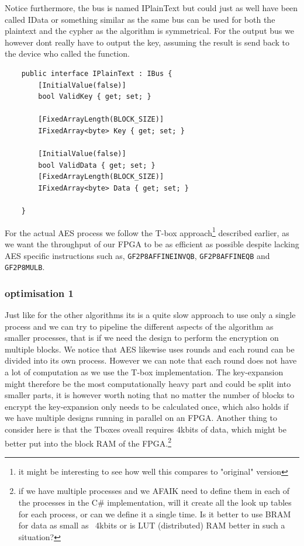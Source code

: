 \documentclass[a4paper]{article}
\begin{document}
Notice furthermore, the bus is named IPlainText but could just as well have been called IData or something similar as the same bus can be used for both the plaintext and the cypher as the algorithm is symmetrical. For the output bus we however dont really have to output the key, assuming the result is send back to the device who called the function.
\begin{verbatim}
    public interface IPlainText : IBus {
        [InitialValue(false)]
        bool ValidKey { get; set; }

        [FixedArrayLength(BLOCK_SIZE)]
        IFixedArray<byte> Key { get; set; }

        [InitialValue(false)]
        bool ValidData { get; set; }
        [FixedArrayLength(BLOCK_SIZE)]
        IFixedArray<byte> Data { get; set; }

    }
\end{verbatim}
For the actual AES process we follow the T-box approach\footnote{it might be interesting to see how well this compares to "original" version} described earlier, as we want the throughput of our FPGA to be as efficient as possible despite lacking AES specific instructions such as, \texttt{GF2P8AFFINEINVQB}, \texttt{GF2P8AFFINEQB} and \texttt{GF2P8MULB}.
\subsubsection{optimisation 1}
\label{AESopt}
Just like for the other algorithms its is a quite slow approach to use only a single process and we can try to pipeline the different aspects of the algorithm as smaller processes, that is if we need the design to perform the encryption on multiple blocks. We notice that AES likewise uses rounds and each round can be divided into its own process. However we can note that each round does not have a lot of computation as we use the T-box implementation. The key-expansion might therefore be the most computationally heavy part and could be split into smaller parts, it is however worth noting that no matter the number of blocks to encrypt the key-expansion only needs to be calculated once, which also holds if we have multiple designs running in parallel on an FPGA. Another thing to consider here is that the Tboxes oveall requires 4kbits of data, which might be better put into the block RAM of the FPGA.\footnote{if we have multiple processes and we AFAIK need to define them in each of the processes in the C# implementation, will it create all the look up tables for each process, or can we define it a single time. Is it better to use BRAM for data as small as ~4kbits or is LUT (distributed) RAM better in such a situation?}
\end{document}
